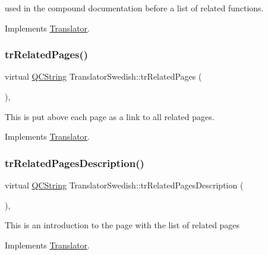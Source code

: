 used in the compound documentation before a list of related functions. 

Implements \mbox{\hyperlink{class_translator}{Translator}}.

\mbox{\label{class_translator_swedish_aa112203c994a0fbabf261e8c81b6fa7c}} 
\subsubsection{\texorpdfstring{trRelatedPages()}{trRelatedPages()}}
{\footnotesize\ttfamily virtual \mbox{\hyperlink{class_q_c_string}{Q\+C\+String}} Translator\+Swedish\+::tr\+Related\+Pages (\begin{DoxyParamCaption}{ }\end{DoxyParamCaption})\hspace{0.3cm}{\ttfamily [inline]}, {\ttfamily [virtual]}}

This is put above each page as a link to all related pages. 

Implements \mbox{\hyperlink{class_translator}{Translator}}.

\mbox{\label{class_translator_swedish_a93f91cb4fb4d425035a274901d31778d}} 
\subsubsection{\texorpdfstring{trRelatedPagesDescription()}{trRelatedPagesDescription()}}
{\footnotesize\ttfamily virtual \mbox{\hyperlink{class_q_c_string}{Q\+C\+String}} Translator\+Swedish\+::tr\+Related\+Pages\+Description (\begin{DoxyParamCaption}{ }\end{DoxyParamCaption})\hspace{0.3cm}{\ttfamily [inline]}, {\ttfamily [virtual]}}

This is an introduction to the page with the list of related pages 

Implements \mbox{\hyperlink{class_translator}{Translator}}.

\mbox{\label{class_translator_swedish_af73ad5a37d7bbde4fd8724e5c402722f}} 
